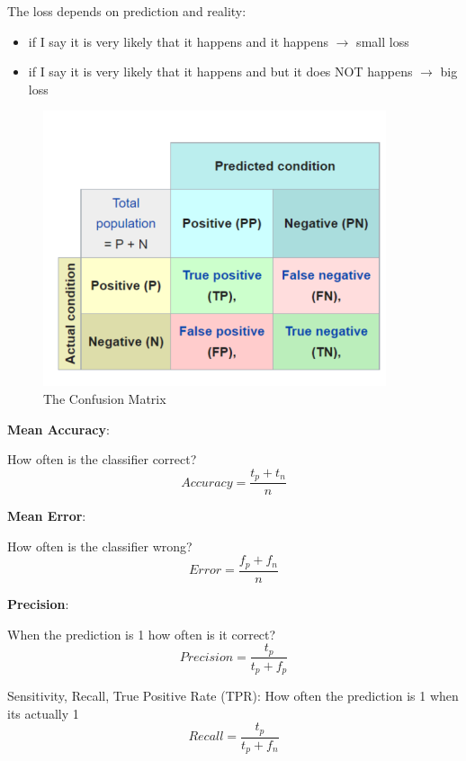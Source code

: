 \documentclass[11pt,twoside,landscape]{article}
\begin{document}
\begin{multicols}{3}
The loss depends on prediction and reality:
\begin{itemize}
\item if I say it is very likely that it happens and it happens \(\rightarrow\) small loss
\item if I say it is very likely that it happens and but it does NOT happens \(\rightarrow\) big loss
\end{itemize}

\begin{figure}[htbp]
\centering
\includegraphics[width=.9\linewidth]{img/confusion_matrix.png}
\caption{The Confusion Matrix}
\end{figure}


\textbf{Mean Accuracy}:

How often is the classifier correct?
\begin{equation}
Accuracy = \frac{t_p + t_n}{n}
\end{equation}

\textbf{Mean Error}:

How often is the classifier wrong?
\begin{equation}
Error = \frac{f_p + f_n}{n}
\end{equation}

\textbf{Precision}:

When the prediction is 1 how often is it correct?
\begin{equation}
Precision = \frac{t_p}{t_p + f_p}
\end{equation}

Sensitivity, Recall, True Positive Rate (TPR): How often the prediction is 1 when its actually 1
\begin{equation}
Recall = \frac{t_p}{t_p + f_n}
\end{equation}


\end{multicols}
\end{document}

